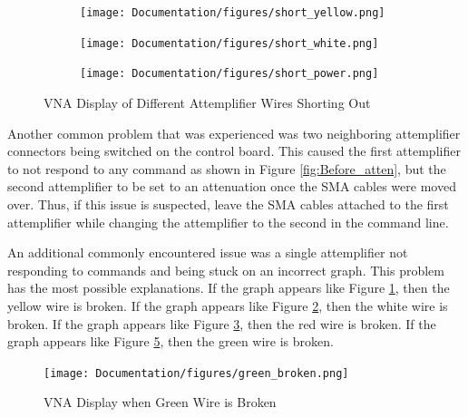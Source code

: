 \documentclass[12pt,a4paper,oneside]{article}
\begin{document}
\begin{figure}[H]
 \centering
 
 \begin{subfigure}[b]{.6\linewidth}
   \texttt{[image: Documentation/figures/short\_yellow.png]}
   \caption{}
   \label{fig:shortout_yellow}
 \end{subfigure}
 
 \begin{subfigure}[b]{.6\linewidth}
  \centering
   \texttt{[image: Documentation/figures/short\_white.png]}
   \caption{}
   \label{fig:shortout_white}
 \end{subfigure}
 
 \begin{subfigure}[b]{.6\linewidth}
  \centering
  \texttt{[image: Documentation/figures/short\_power.png]}
  \caption{}
  \label{fig:shortout_red}
 \end{subfigure}

 \caption{VNA Display of Different Attemplifier Wires Shorting Out}
 \label{fig:three graphs}
 
\end{figure}


Another common problem that was experienced was two neighboring attemplifier connectors being switched on the control board. This caused the first attemplifier to not respond to any command as shown in Figure \ref{fig:Before_atten}, but the second attemplifier to be set to an attenuation once the SMA cables were moved over. Thus, if this issue is suspected, leave the SMA cables attached to the first attemplifier while changing the attemplifier to the second in the command line.

An additional commonly encountered issue was a single attemplifier not responding to commands and being stuck on an incorrect graph. This problem has the most possible explanations. If the graph appears like Figure \ref{fig:shortout_yellow}, then the yellow wire is broken. If the graph appears like Figure \ref{fig:shortout_white}, then the white wire is broken. If the graph appears like Figure \ref{fig:shortout_red}, then the red wire is broken. If the graph appears like Figure \ref{fig:green_broken}, then the green wire is broken. 


 \begin{figure}[H]
 \centering
 \texttt{[image: Documentation/figures/green\_broken.png]}
 \caption{VNA Display when Green Wire is Broken}
 \label{fig:green_broken}
 \end{figure}
 
\end{document}
